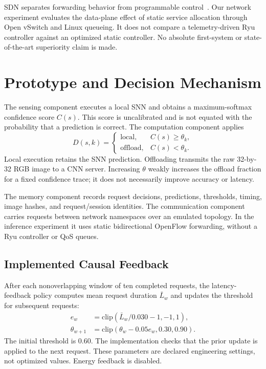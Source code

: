 \documentclass[journal]{IEEEtran}
\begin{document}
SDN separates forwarding behavior from programmable control~\cite{kreutz2014software,mckeown2008openflow}. Our network experiment evaluates the data-plane effect of static service allocation through Open vSwitch and Linux queueing. It does not compare a telemetry-driven Ryu controller against an optimized static controller. No absolute first-system or state-of-the-art superiority claim is made.

\section{Prototype and Decision Mechanism}
\label{sec:architecture}
The sensing component executes a local SNN and obtains a maximum-softmax confidence score $C(s)$. This score is uncalibrated and is not equated with the probability that a prediction is correct. The computation component applies
\begin{equation}
D(s,k)=\begin{cases}
\mathrm{local},&C(s)\geq\theta_k,\\
\mathrm{offload},&C(s)<\theta_k.
\end{cases}
\label{eq:decision}
\end{equation}
Local execution retains the SNN prediction. Offloading transmits the raw 32-by-32 RGB image to a CNN server. Increasing $\theta$ weakly increases the offload fraction for a fixed confidence trace; it does not necessarily improve accuracy or latency.

The memory component records request decisions, predictions, thresholds, timing, image hashes, and request/session identities. The communication component carries requests between network namespaces over an emulated topology. In the inference experiment it uses static bidirectional OpenFlow forwarding, without a Ryu controller or QoS queues.

\subsection{Implemented Causal Feedback}
After each nonoverlapping window of ten completed requests, the latency-feedback policy computes mean request duration $\bar L_w$ and updates the threshold for subsequent requests:
\begin{align}
e_w&=\mathrm{clip}(\bar L_w/0.030-1,-1,1),\\
\theta_{w+1}&=\mathrm{clip}(\theta_w-0.05e_w,0.30,0.90).
\label{eq:feedback}
\end{align}
The initial threshold is 0.60. The implementation checks that the prior update is applied to the next request. These parameters are declared engineering settings, not optimized values. Energy feedback is disabled.
\end{document}
